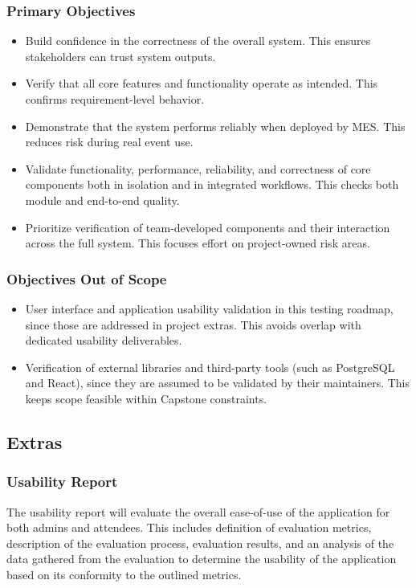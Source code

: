 \documentclass[12pt, titlepage]{article}
\begin{document}
\subsubsection{Primary Objectives}
\begin{itemize}
  \item Build confidence in the correctness of the overall system. This ensures stakeholders can trust system outputs.
  \item Verify that all core features and functionality operate as intended. This confirms requirement-level behavior.
  \item Demonstrate that the system performs reliably when deployed by MES. This reduces risk during real event use.
  \item Validate functionality, performance, reliability, and correctness of core components both in isolation and in integrated workflows. This checks both module and end-to-end quality.
  \item Prioritize verification of team-developed components and their interaction across the full system. This focuses effort on project-owned risk areas.
\end{itemize}

\subsubsection{Objectives Out of Scope}
\begin{itemize}
  \item User interface and application usability validation in this testing roadmap, since those are addressed in project extras. This avoids overlap with dedicated usability deliverables.
  \item Verification of external libraries and third-party tools (such as PostgreSQL and React), since they are assumed to be validated by their maintainers. This keeps scope feasible within Capstone constraints.
\end{itemize}

\subsection{Extras}

\subsubsection{Usability Report}
The usability report will evaluate the overall ease-of-use of the application for both admins and attendees. This
includes definition of evaluation metrics, description of the evaluation process, evaluation results, and an analysis of
the data gathered from the evaluation to determine the usability of the application based on its conformity to the
outlined metrics.
\end{document}
